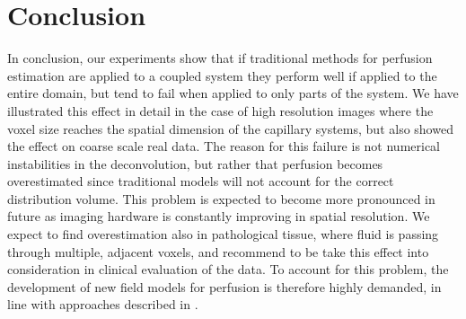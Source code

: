 \documentclass[journal,twocolumn]{IEEEtran}
\begin{document}
	\section{Conclusion}
	In conclusion, our experiments show that if traditional methods for perfusion estimation are applied to a coupled system they perform well if applied to the entire domain, but tend to fail when applied to only parts of the system. 
	We have illustrated this effect in detail in the case of high resolution images where the voxel size reaches the spatial dimension of the capillary systems, but also showed the effect on coarse scale real data.
		The reason for this failure is not numerical instabilities in the deconvolution, but rather that perfusion becomes overestimated since traditional models will not account for the correct distribution volume.
  	This problem is expected to become more pronounced in future as imaging hardware is constantly improving in spatial resolution.
	We expect to find overestimation also in pathological tissue, where fluid is passing through multiple, adjacent voxels, and recommend to be take this effect into consideration in clinical evaluation of the data. To account for this problem, the development of new field models for perfusion is therefore highly demanded, in line with approaches described in \cite{sourbron14,Michler2013}. 	


	
		
	
\end{document}
